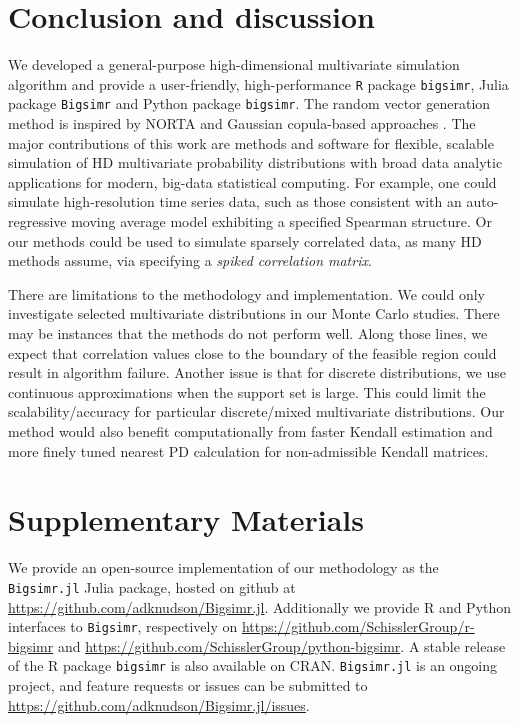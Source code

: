 \documentclass[
]{jss}
\begin{document}
\hypertarget{discussion}{%
\section{Conclusion and discussion}\label{discussion}}

We developed a general-purpose high-dimensional multivariate simulation algorithm and provide a user-friendly, high-performance \texttt{R} package \texttt{bigsimr}, Julia package \texttt{Bigsimr} and Python package \texttt{bigsimr}. The random vector generation method is inspired by NORTA \citep{Cario1997} and Gaussian copula-based approaches \citep[\citet{BF17}, \citet{Xia17}]{MB13}. The major contributions of this work are methods and software for flexible, scalable simulation of HD multivariate probability distributions with broad data analytic applications for modern, big-data statistical computing. For example, one could simulate high-resolution time series data, such as those consistent with an auto-regressive moving average model exhibiting a specified Spearman structure. Or our methods could be used to simulate sparsely correlated data, as many HD methods assume, via specifying a \emph{spiked correlation matrix}.

There are limitations to the methodology and implementation. We could only investigate selected multivariate distributions in our Monte Carlo studies. There may be instances that the methods do not perform well. Along those lines, we expect that correlation values close to the boundary of the feasible region could result in algorithm failure. Another issue is that for discrete distributions, we use continuous approximations when the support set is large. This could limit the scalability/accuracy for particular discrete/mixed multivariate distributions. Our method would also benefit computationally from faster Kendall estimation and more finely tuned nearest PD calculation for non-admissible Kendall matrices.

\hypertarget{misc}{%
\section*{Supplementary Materials}\label{misc}}

We provide an open-source implementation of our methodology as the \texttt{Bigsimr.jl} Julia package, hosted on github at \url{https://github.com/adknudson/Bigsimr.jl}. Additionally we provide R and Python interfaces to \texttt{Bigsimr}, respectively on \url{https://github.com/SchisslerGroup/r-bigsimr} and \url{https://github.com/SchisslerGroup/python-bigsimr}. A stable release of the R package \texttt{bigsimr} is also available on CRAN. \texttt{Bigsimr.jl} is an ongoing project, and feature requests or issues can be submitted to \url{https://github.com/adknudson/Bigsimr.jl/issues}.
\end{document}
